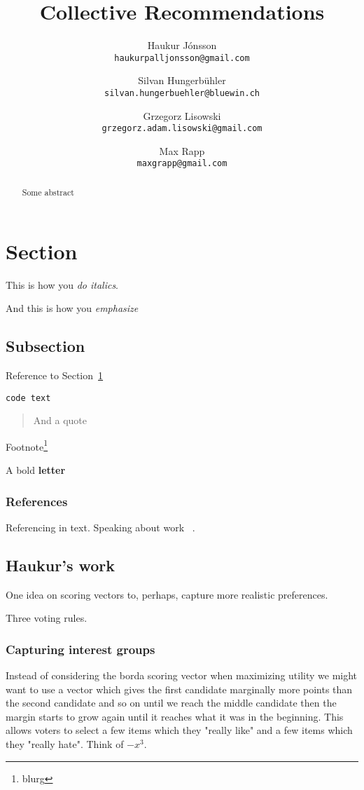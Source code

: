 \documentclass{article}
\title{Collective Recommendations}
\author{
    Haukur J{\'o}nsson \\    \texttt{haukurpalljonsson@gmail.com}
    \and
    Silvan Hungerb{\"u}hler \\   \texttt{silvan.hungerbuehler@bluewin.ch}
    \and
    Grzegorz Lisowski \\  \texttt{grzegorz.adam.lisowski@gmail.com}
    \and
    Max Rapp \\  \texttt{maxgrapp@gmail.com}
}
\begin{document}
\maketitle

\begin{abstract}
Some abstract
\end{abstract}

\section{Section}\label{intro}

This is how you {\it do italics}.

And this is how you {\em emphasize}

\subsection{Subsection}

Reference to Section~\ref{intro}

{\tt code text}

\begin{quote}
And a quote
\end{quote}

Footnote\footnote{blurg}

A bold {\bf letter}

\subsubsection{References}

Referencing   in text. Speaking about work ~\cite{Elkind2015}.

\subsection{Haukur's work}

One idea on scoring vectors to, perhaps, capture more realistic preferences.

Three voting rules.

\subsubsection{Capturing interest groups}

Instead of considering the borda scoring vector when maximizing utility we might want to use a vector which gives the
first candidate marginally more points than the second candidate and so on until we reach the middle candidate then the margin
 starts to grow again until it reaches what it was in the beginning. This allows voters to select a few items which they
 "really like" and a few items which they "really hate". Think of $-x^3$.
\end{document}

